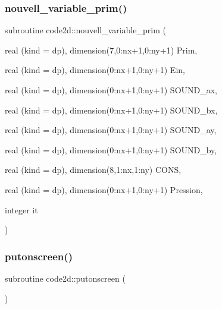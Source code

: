 \mbox{\label{main2Dv1_01_07copy_08_8f90_a7e8756401e9774b000709214edc41a76}} 
\subsubsection{\texorpdfstring{nouvell\+\_\+variable\+\_\+prim()}{nouvell\_variable\_prim()}}
{\footnotesize\ttfamily subroutine code2d\+::nouvell\+\_\+variable\+\_\+prim (\begin{DoxyParamCaption}\item[{real (kind = dp), dimension(7,0\+:nx+1,0\+:ny+1)}]{Prim,  }\item[{real (kind = dp), dimension(0\+:nx+1,0\+:ny+1)}]{Ein,  }\item[{real (kind = dp), dimension(0\+:nx+1,0\+:ny+1)}]{S\+O\+U\+N\+D\+\_\+ax,  }\item[{real (kind = dp), dimension(0\+:nx+1,0\+:ny+1)}]{S\+O\+U\+N\+D\+\_\+bx,  }\item[{real (kind = dp), dimension(0\+:nx+1,0\+:ny+1)}]{S\+O\+U\+N\+D\+\_\+ay,  }\item[{real (kind = dp), dimension(0\+:nx+1,0\+:ny+1)}]{S\+O\+U\+N\+D\+\_\+by,  }\item[{real (kind = dp), dimension(8,1\+:nx,1\+:ny)}]{C\+O\+NS,  }\item[{real (kind = dp), dimension(0\+:nx+1,0\+:ny+1)}]{Pression,  }\item[{integer}]{it }\end{DoxyParamCaption})}

\mbox{\label{main2Dv1_01_07copy_08_8f90_a8a5b072c001df1496416cc96562c9916}} 
\subsubsection{\texorpdfstring{putonscreen()}{putonscreen()}}
{\footnotesize\ttfamily subroutine code2d\+::putonscreen (\begin{DoxyParamCaption}{ }\end{DoxyParamCaption})}

